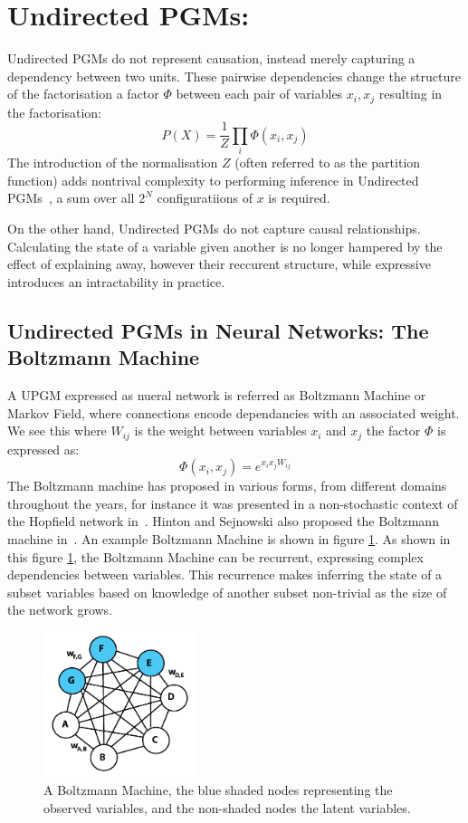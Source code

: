 \section{Undirected PGMs:}

Undirected PGMs do not represent causation, instead merely capturing a dependency between two units. These pairwise dependencies change the structure of the factorisation a factor $\Phi$ between each pair of variables $x_i,x_j$ resulting in the factorisation:
$$
P(X) = \frac{1}{Z} \prod_i \Phi(x_i, x_j)
$$
The introduction of the normalisation $Z$ (often referred to as the partition function) adds nontrival complexity to performing inference in Undirected PGMs~\todocite{}, a sum over all $2^N$ configuratiions of $x$ is required.

On the other hand, Undirected PGMs do not capture causal relationships. Calculating the state of a variable given another is no longer hampered by the effect of explaining away, however their reccurent structure, while expressive introduces an intractability in practice.

\subsection{Undirected PGMs in Neural Networks: The Boltzmann Machine}
A UPGM expressed as nueral network is referred as Boltzmann Machine or Markov Field, where connections encode dependancies with an associated weight. We see this where $W_{ij}$ is the weight between variables $x_i$ and $x_j$ the factor $\Phi$ is expressed as:
$$
\Phi(x_i, x_j) = e^{x_ix_jW_{ij}}
$$
The Boltzmann machine has proposed in various forms, from different domains throughout the years, for instance it was presented in a non-stochastic context of the Hopfield network in~\cite{Hopfield01041982}. Hinton and Sejnowski also proposed the Boltzmann machine in~\cite{geoffreye.hintonterrencej.sejnowski1983}. An example Boltzmann Machine is shown in figure \ref{F:Boltzmann-Machine}. As shown in this figure \ref{F:Boltzmann-Machine}, the Boltzmann Machine can be recurrent, expressing complex dependencies between variables. This recurrence makes inferring the state of a subset variables based on knowledge of another subset non-trivial as the size of the network grows\todocite{}.
\begin{figure}[h]
\begin{center}
  \includegraphics[width = 0.4\textwidth]{Assets/Boltzmann_Machine.png}
\caption{A Boltzmann Machine, the blue shaded nodes representing the observed variables, and the non-shaded nodes the latent variables.}
\label{F:Boltzmann-Machine}
\end{center}
\end{figure}

